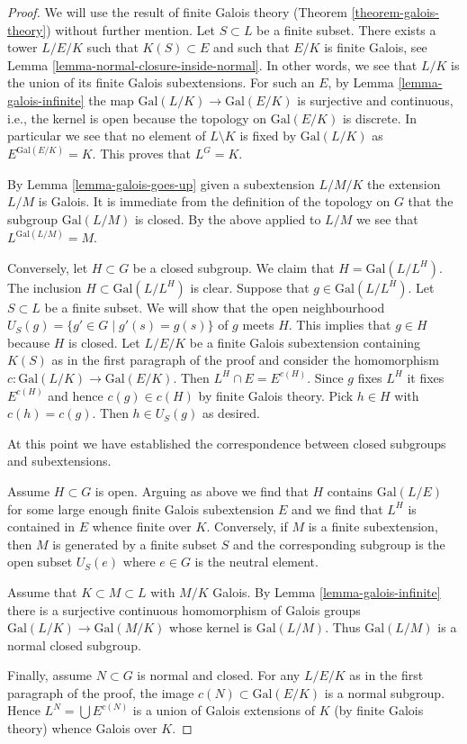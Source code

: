 \begin{proof}
We will use the result of finite Galois theory
(Theorem \ref{theorem-galois-theory})
without further mention.
Let $S \subset L$ be a finite subset. There exists a tower
$L/E/K$ such that $K(S) \subset E$ and such that
$E/K$ is finite Galois, see Lemma \ref{lemma-normal-closure-inside-normal}.
In other words, we see that $L/K$ is the union of its finite
Galois subextensions.
For such an $E$, by Lemma \ref{lemma-galois-infinite}
the map $\text{Gal}(L/K) \to \text{Gal}(E/K)$ is surjective
and continuous, i.e., the kernel is open because the topology
on $\text{Gal}(E/K)$ is discrete.
In particular we see that no element of $L \setminus K$ is fixed by
$\text{Gal}(L/K)$ as $E^{\text{Gal}(E/K)} = K$.
This proves that $L^G = K$.

\medskip\noindent
By Lemma \ref{lemma-galois-goes-up} given a subextension $L/M/K$
the extension $L/M$ is Galois. It is immediate from the definition
of the topology on $G$ that the subgroup $\text{Gal}(L/M)$ is closed.
By the above applied to $L/M$ we see that $L^{\text{Gal}(L/M)} = M$.

\medskip\noindent
Conversely, let $H \subset G$ be a closed subgroup. We claim that
$H = \text{Gal}(L/L^H)$. The inclusion $H \subset \text{Gal}(L/L^H)$
is clear. Suppose that $g \in \text{Gal}(L/L^H)$. Let $S \subset L$
be a finite subset. We will show that the open neighbourhood
$U_S(g) = \{g' \in G \mid g'(s) = g(s)\}$ of $g$ meets $H$.
This implies that $g \in H$ because $H$ is closed.
Let $L/E/K$ be a finite Galois subextension containing $K(S)$
as in the first paragraph of the proof and consider the homomorphism
$c : \text{Gal}(L/K) \to \text{Gal}(E/K)$.
Then $L^H \cap E = E^{c(H)}$. Since $g$ fixes $L^H$ it fixes
$E^{c(H)}$ and hence $c(g) \in c(H)$ by finite Galois theory.
Pick $h \in H$ with $c(h) = c(g)$. Then $h \in U_S(g)$ as desired.

\medskip\noindent
At this point we have established the correspondence between closed
subgroups and subextensions.

\medskip\noindent
Assume $H \subset G$ is open. Arguing as above we find that
$H$ contains $\text{Gal}(L/E)$ for some large enough finite
Galois subextension $E$ and we find that $L^H$ is contained
in $E$ whence finite over $K$. Conversely, if $M$ is a finite
subextension, then $M$ is generated by a finite subset $S$
and the corresponding subgroup is the open subset $U_S(e)$
where $e \in G$ is the neutral element.

\medskip\noindent
Assume that $K \subset M \subset L$ with $M/K$ Galois.
By Lemma \ref{lemma-galois-infinite} there is a surjective
continuous homomorphism of Galois groups
$\text{Gal}(L/K) \to \text{Gal}(M/K)$ whose
kernel is $\text{Gal}(L/M)$. Thus $\text{Gal}(L/M)$ is a normal
closed subgroup.

\medskip\noindent
Finally, assume $N \subset G$ is normal and closed. For any
$L/E/K$ as in the first paragraph of the proof, the image
$c(N) \subset \text{Gal}(E/K)$ is a normal subgroup.
Hence $L^N = \bigcup E^{c(N)}$ is a union of Galois extensions
of $K$ (by finite Galois theory) whence Galois over $K$.
\end{proof}
